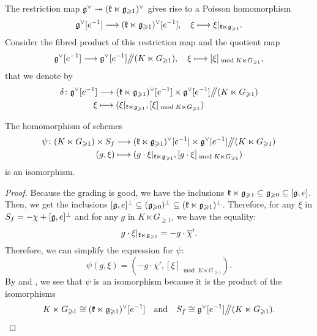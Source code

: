 The restriction map $\mathfrak g^\vee \twoheadrightarrow (\mathfrak k \ltimes \mathfrak g_{\geqslant 1})^\vee$ gives rise to a Poisson homomorphism
\[ \mathfrak g^\vee[e^{-1}] \longrightarrow (\mathfrak k \ltimes \mathfrak g_{\geqslant 1})^\vee[e^{-1}], \quad \xi \longmapsto \xi|_{\mathfrak k \ltimes \mathfrak g_{\geqslant 1}}. \]
Consider the fibred product of this restriction map and the quotient map
\[ \mathfrak g^\vee[e^{-1}] \longrightarrow \mathfrak g^\vee[e^{-1}] \big/\!\!\big/ (K \ltimes G_{\geqslant 1}), \quad \xi \longmapsto [\xi]_{\bmod K \ltimes G_{\geqslant 1}}, \]
that we denote by
\[ \begin{aligned}
	\delta \colon \mathfrak g^\vee[e^{-1}] & \longrightarrow (\mathfrak k \ltimes \mathfrak g_{\geqslant 1})^\vee[e^{-1}] \times \mathfrak g^\vee[e^{-1}] \big/\!\!\big/ (K \ltimes G_{\geqslant 1}) \\
	\xi & \longmapsto  (\xi|_{\mathfrak k \ltimes \mathfrak g_{\geqslant 1}}, [\xi]_{\bmod K \ltimes G_{\geqslant 1}})
\end{aligned} \]

\begin{lemma} \label{lemma:gan-ginzburg-decomposition}
	The homomorphism of schemes
	\[ \begin{aligned}
		\psi \colon (K \ltimes G_{\geqslant 1}) \times S_f & \longrightarrow (\mathfrak k \ltimes \mathfrak g_{\geqslant 1})^\vee[e^{-1}] \times \mathfrak g^\vee[e^{-1}] \big/\!\!\big/ (K \ltimes G_{\geqslant 1}) \\
		(g,\xi) & \longmapsto  (g \cdot \xi|_{\mathfrak k \ltimes \mathfrak g_{\geqslant 1}}, [g \cdot \xi]_{\bmod K \ltimes G_{\geqslant 1}})
	\end{aligned} \]
	is an isomorphism.
\end{lemma}

\begin{proof}
	Because the grading is good, we have the inclusions $\mathfrak k \ltimes \mathfrak g_{\geqslant 1} \subseteq \mathfrak g_{\geqslant 0} \subseteq [\mathfrak g, e]$. Then, we get the inclusions $[\mathfrak g, e]^\perp \subseteq (\mathfrak g_{\geqslant 0})^{\perp} \subseteq (\mathfrak k \ltimes \mathfrak g_{\geqslant 1})^{\perp}$.	Therefore, for any $\xi$ in $S_f = - \chi + [\mathfrak g, e]^\perp$ and for any $g$ in $K \ltimes G_{\geqslant 1}$, we have the equality:
	\[ g \cdot \xi|_{\mathfrak k \ltimes \mathfrak g_{\geqslant 1}} = - g \cdot \overline{\chi}'. \]
	Therefore, we can simplify the expression for $\psi$:
	\[ \psi(g, \xi) = (- g \cdot \overline{\chi}', [\xi]_{\bmod K \ltimes G_{\geqslant 1}}). \]
	By  and , we see that $\psi$ is an isomorphism because it is the product of the isomorphisms
	\[ K \ltimes G_{\geqslant 1} \cong (\mathfrak k \ltimes \mathfrak g_{\geqslant 1})^\vee[e^{-1}] \quad \text{and} \quad S_f \cong \mathfrak g^\vee[e^{-1}] \big/\!\!\big/ (K \ltimes G_{\geqslant 1}). \]
\end{proof}

